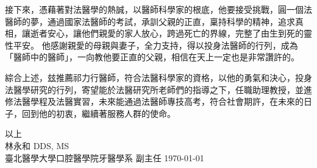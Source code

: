 \documentclass{letter}
\begin{document}
\begin{letter}
接下來，憑藉著對法醫學的熱誠，以醫師科學家的根底，他要接受挑戰，圓一個法醫師的夢，通過國家法醫師的考試，承訓父親的正直，稟持科學的精神，追求真相，讓逝者安心，讓他們親愛的家人放心，跨過死亡的界線，完整了由生到死的靈性平安。
他感謝親愛的母親與妻子，全力支持，得以投身法醫師的行列，成為「醫師中的醫師」，一向教他要正直的父親，相信在天上一定也是非常讚許的。


綜合上述，玆推薦祁力行醫師，符合法醫科學家的資格，以他的勇氣和決心，投身法醫學研究的行列，寄望能於法醫研究所老師們的指導之下，任職助理教授，並進修法醫學程及法醫實習，未來能通過法醫師專技高考，符合社會期許，在未來的日子，回到他的初衷，繼續著服務人群的使命。

\medskip
以上\\
林永和 DDS, MS\hspace{3mm}\\
臺北醫學大學口腔醫學院牙醫學系 副主任 \hspace{5mm} \today


\clearpage

%


\end{letter}
\end{document}
